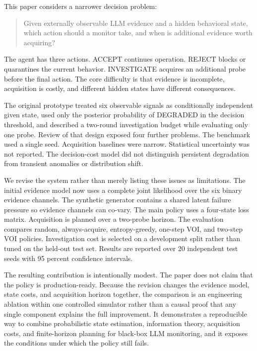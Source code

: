 \documentclass{article}
\begin{document}
This paper considers a narrower decision problem:

\begin{quote}
Given externally observable LLM evidence and a hidden behavioral state, which action should a monitor take, and when is additional evidence worth acquiring?
\end{quote}

The agent has three actions. ACCEPT continues operation. REJECT blocks or quarantines the current behavior. INVESTIGATE acquires an additional probe before the final action. The core difficulty is that evidence is incomplete, acquisition is costly, and different hidden states have different consequences.

The original prototype treated six observable signals as conditionally independent given state, used only the posterior probability of DEGRADED in the decision threshold, and described a two-round investigation budget while evaluating only one probe. Review of that design exposed four further problems. The benchmark used a single seed. Acquisition baselines were narrow. Statistical uncertainty was not reported. The decision-cost model did not distinguish persistent degradation from transient anomalies or distribution shift.

We revise the system rather than merely listing these issues as limitations. The initial evidence model now uses a complete joint likelihood over the six binary evidence channels. The synthetic generator contains a shared latent failure pressure so evidence channels can co-vary. The main policy uses a four-state loss matrix. Acquisition is planned over a two-probe horizon. The evaluation compares random, always-acquire, entropy-greedy, one-step VOI, and two-step VOI policies. Investigation cost is selected on a development split rather than tuned on the held-out test set. Results are reported over 20 independent test seeds with 95 percent confidence intervals.

The resulting contribution is intentionally modest. The paper does not claim that the policy is production-ready. Because the revision changes the evidence model, state costs, and acquisition horizon together, the comparison is an engineering ablation within one controlled simulator rather than a causal proof that any single component explains the full improvement. It demonstrates a reproducible way to combine probabilistic state estimation, information theory, acquisition costs, and finite-horizon planning for black-box LLM monitoring, and it exposes the conditions under which the policy still fails.
\end{document}
